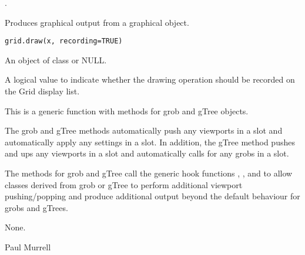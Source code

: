 %
\begin{SeeAlso}\relax
{}.
\end{SeeAlso}
%
\begin{Examples}
\end{Examples}
%
\begin{Description}\relax
Produces graphical output from a graphical object.
\end{Description}
%
\begin{Usage}
\begin{verbatim}
grid.draw(x, recording=TRUE)
\end{verbatim}
\end{Usage}
%
\begin{Arguments}
\begin{ldescription}
\item[\code{x}] An object of class  or NULL.
\item[\code{recording}] A logical value to indicate whether the drawing
operation should be recorded on the Grid display list.
\end{ldescription}
\end{Arguments}
%
\begin{Details}\relax
This is a generic function with methods for grob and gTree objects.

The grob and gTree methods automatically push any viewports in a
 slot and automatically apply any  settings
in a  slot.  In addition, the gTree method pushes and
ups any viewports in a  slot and automatically
calls  for any grobs in a  slot.

The methods for grob and gTree call the generic hook functions
, , and 
to allow classes derived from grob or gTree to perform
additional viewport pushing/popping and produce additional
output beyond the default behaviour for grobs and gTrees.
\end{Details}
%
\begin{Value}
None.
\end{Value}
%
\begin{Author}\relax
Paul Murrell
\end{Author}
